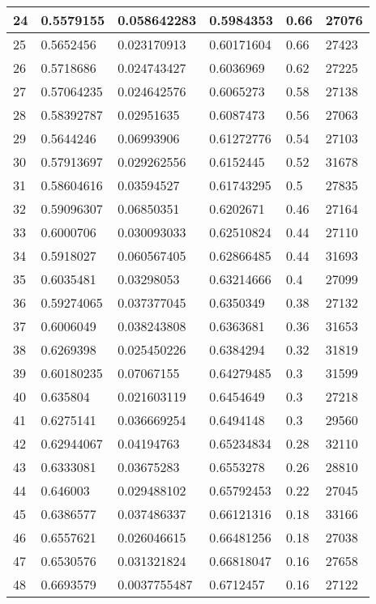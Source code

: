 \begin{longtable}{|l|l|l|l|l|l|}
24 & 0.5579155 & 0.058642283 & 0.5984353 & 0.66 & 27076 \\ \hline 
25 & 0.5652456 & 0.023170913 & 0.60171604 & 0.66 & 27423 \\ \hline 
26 & 0.5718686 & 0.024743427 & 0.6036969 & 0.62 & 27225 \\ \hline 
27 & 0.57064235 & 0.024642576 & 0.6065273 & 0.58 & 27138 \\ \hline 
28 & 0.58392787 & 0.02951635 & 0.6087473 & 0.56 & 27063 \\ \hline 
29 & 0.5644246 & 0.06993906 & 0.61272776 & 0.54 & 27103 \\ \hline 
30 & 0.57913697 & 0.029262556 & 0.6152445 & 0.52 & 31678 \\ \hline 
31 & 0.58604616 & 0.03594527 & 0.61743295 & 0.5 & 27835 \\ \hline 
32 & 0.59096307 & 0.06850351 & 0.6202671 & 0.46 & 27164 \\ \hline 
33 & 0.6000706 & 0.030093033 & 0.62510824 & 0.44 & 27110 \\ \hline 
34 & 0.5918027 & 0.060567405 & 0.62866485 & 0.44 & 31693 \\ \hline 
35 & 0.6035481 & 0.03298053 & 0.63214666 & 0.4 & 27099 \\ \hline 
36 & 0.59274065 & 0.037377045 & 0.6350349 & 0.38 & 27132 \\ \hline 
37 & 0.6006049 & 0.038243808 & 0.6363681 & 0.36 & 31653 \\ \hline 
38 & 0.6269398 & 0.025450226 & 0.6384294 & 0.32 & 31819 \\ \hline 
39 & 0.60180235 & 0.07067155 & 0.64279485 & 0.3 & 31599 \\ \hline 
40 & 0.635804 & 0.021603119 & 0.6454649 & 0.3 & 27218 \\ \hline 
41 & 0.6275141 & 0.036669254 & 0.6494148 & 0.3 & 29560 \\ \hline 
42 & 0.62944067 & 0.04194763 & 0.65234834 & 0.28 & 32110 \\ \hline 
43 & 0.6333081 & 0.03675283 & 0.6553278 & 0.26 & 28810 \\ \hline 
44 & 0.646003 & 0.029488102 & 0.65792453 & 0.22 & 27045 \\ \hline 
45 & 0.6386577 & 0.037486337 & 0.66121316 & 0.18 & 33166 \\ \hline 
46 & 0.6557621 & 0.026046615 & 0.66481256 & 0.18 & 27038 \\ \hline 
47 & 0.6530576 & 0.031321824 & 0.66818047 & 0.16 & 27658 \\ \hline 
48 & 0.6693579 & 0.0037755487 & 0.6712457 & 0.16 & 27122 \\ \hline 

\end{longtable}
